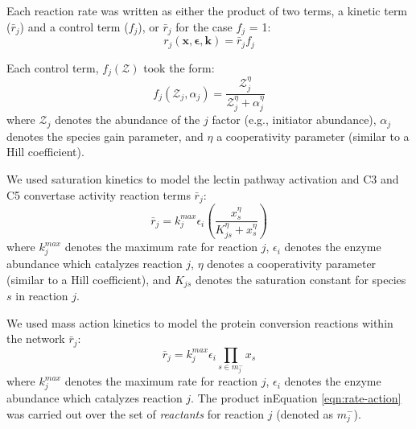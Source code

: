 \documentclass[12pt]{article}
\begin{document}
Each reaction rate was written as either the product of two terms, a kinetic term ($\bar{r}_{j}$) and a control term ($f_{j}$), or $\bar{r}_{j}$ for the case $f_{j}$ = 1:
\begin{equation}\label{eqn:rate-factor}
	r_{j}\left(\mathbf{x},\mathbf{\epsilon},\mathbf{k}\right) = \bar{r}_{j}f_{j}
\end{equation}

Each control term, $f_{j}\left(\mathcal{Z}\right)$ took the form:
\begin{equation}\label{eqn:control-factor}
	f_{j}\left(\mathcal{Z}_{j},\alpha_{j}\right) = \frac{\mathcal{Z}_{j}^{\eta}}{\mathcal{Z}_{j}^{\eta} + \alpha_{j}^{\eta}}
\end{equation}where $\mathcal{Z}_{j}$ denotes the abundance of the $j$ factor (e.g., initiator abundance),
$\alpha_{j}$ denotes the species gain parameter, and $\eta$ a cooperativity parameter (similar to a Hill coefficient).


We used saturation kinetics to model the lectin pathway activation and C3 and C5 convertase activity reaction terms $\bar{r}_{j}$:
\begin{equation}\label{eqn:rate-saturation}
	\bar{r}_{j} = k_{j}^{max}\epsilon_{i}\left(\frac{x_{s}^{\eta}}{K_{js}^{\eta} + x_{s}^{\eta}}\right)
\end{equation}
where $k_{j}^{max}$ denotes the maximum rate for reaction $j$, $\epsilon_{i}$ denotes the enzyme abundance which catalyzes reaction $j$, $\eta$ denotes a cooperativity parameter (similar to a Hill coefficient),
and $K_{js}$ denotes the saturation constant for species $s$ in reaction $j$.

We used mass action kinetics to model the protein conversion reactions within the network $\bar{r}_{j}$:
\begin{equation}\label{eqn:rate-action}
	\bar{r}_{j} = k_{j}^{max}\epsilon_{i}\prod_{s\in{m_{j}^{-}}}x_{s}
\end{equation}
where $k_{j}^{max}$ denotes the maximum rate for reaction $j$, $\epsilon_{i}$ denotes the enzyme abundance which catalyzes reaction $j$. The product in\linebreak Equation \eqref{eqn:rate-action} was carried out over the set of \textit{reactants} for reaction $j$ (denoted as $m_{j}^{-}$).
\end{document}
